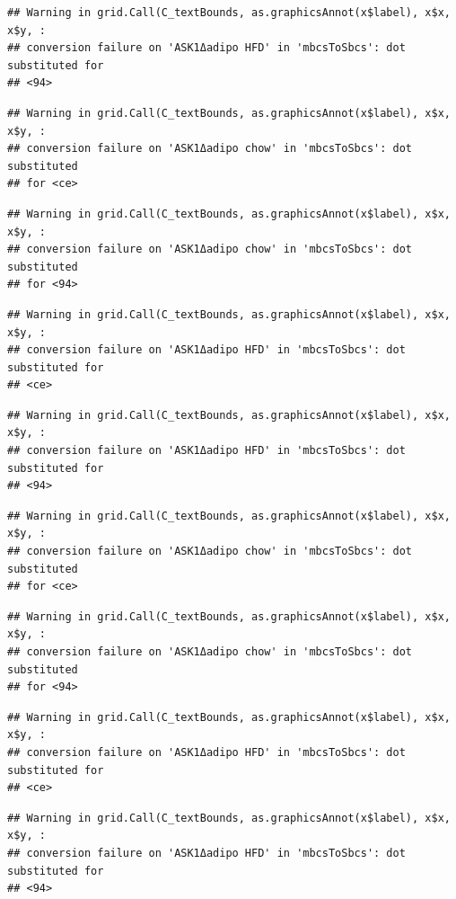 \documentclass[]{book}
\begin{document}
\begin{verbatim}
## Warning in grid.Call(C_textBounds, as.graphicsAnnot(x$label), x$x, x$y, :
## conversion failure on 'ASK1Δadipo HFD' in 'mbcsToSbcs': dot substituted for
## <94>
\end{verbatim}

\begin{verbatim}
## Warning in grid.Call(C_textBounds, as.graphicsAnnot(x$label), x$x, x$y, :
## conversion failure on 'ASK1Δadipo chow' in 'mbcsToSbcs': dot substituted
## for <ce>
\end{verbatim}

\begin{verbatim}
## Warning in grid.Call(C_textBounds, as.graphicsAnnot(x$label), x$x, x$y, :
## conversion failure on 'ASK1Δadipo chow' in 'mbcsToSbcs': dot substituted
## for <94>
\end{verbatim}

\begin{verbatim}
## Warning in grid.Call(C_textBounds, as.graphicsAnnot(x$label), x$x, x$y, :
## conversion failure on 'ASK1Δadipo HFD' in 'mbcsToSbcs': dot substituted for
## <ce>
\end{verbatim}

\begin{verbatim}
## Warning in grid.Call(C_textBounds, as.graphicsAnnot(x$label), x$x, x$y, :
## conversion failure on 'ASK1Δadipo HFD' in 'mbcsToSbcs': dot substituted for
## <94>
\end{verbatim}

\begin{verbatim}
## Warning in grid.Call(C_textBounds, as.graphicsAnnot(x$label), x$x, x$y, :
## conversion failure on 'ASK1Δadipo chow' in 'mbcsToSbcs': dot substituted
## for <ce>
\end{verbatim}

\begin{verbatim}
## Warning in grid.Call(C_textBounds, as.graphicsAnnot(x$label), x$x, x$y, :
## conversion failure on 'ASK1Δadipo chow' in 'mbcsToSbcs': dot substituted
## for <94>
\end{verbatim}

\begin{verbatim}
## Warning in grid.Call(C_textBounds, as.graphicsAnnot(x$label), x$x, x$y, :
## conversion failure on 'ASK1Δadipo HFD' in 'mbcsToSbcs': dot substituted for
## <ce>
\end{verbatim}

\begin{verbatim}
## Warning in grid.Call(C_textBounds, as.graphicsAnnot(x$label), x$x, x$y, :
## conversion failure on 'ASK1Δadipo HFD' in 'mbcsToSbcs': dot substituted for
## <94>
\end{verbatim}
\end{document}
